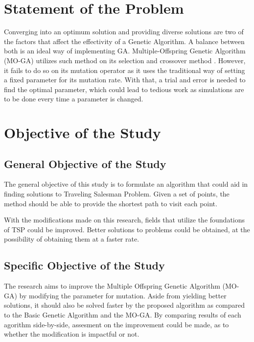 \section{Statement of the Problem}

\indent \indent 	Converging into an optimum solution and providing diverse solutions are two of the factors that affect the effectivity of a Genetic Algorithm\cite{srinivas1994adaptive}. A balance between both is an ideal way of implementing GA. Multiple-Offspring Genetic Algorithm (MO-GA) utilizes such method on its selection and crossover method \cite{wang2016multi}. However, it fails to do so on its mutation operator as it uses the traditional way of setting a fixed parameter for its mutation rate. With that, a trial and error is needed to find the optimal parameter, which could lead to tedious work as simulations are to be done every time a parameter is changed.

\section{Objective of the Study}

\subsection{General Objective of the Study}

\indent \indent The general objective of this study is to formulate an algorithm that could aid in finding solutions to Traveling Salesman Problem. Given a set of points, the method should be able to provide the shortest path to visit each point.\par
With the modifications made on this research, fields that utilize the foundations of TSP could be improved. Better solutions to problems could be obtained, at the possibility of obtaining them at a faster rate.

\subsection{Specific Objective of the Study}

\indent \indent  The research aims to improve the Multiple Offspring Genetic Algorithm (MO-GA) by modifying the parameter for mutation. Aside from yielding better solutions, it should also be solved faster by the proposed algorithm as compared to the Basic Genetic Algorithm and the MO-GA. By comparing results of each agorithm side-by-side, assesment on the improvement could be made, as to whether the modification is impactful or not.

